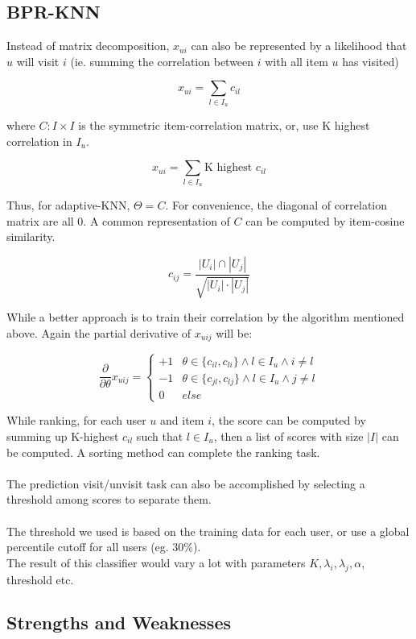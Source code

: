 \documentclass[paper=a4, fontsize=11pt, twocolumn]{scrartcl} %
\numberwithin{equation}{section} %
\numberwithin{figure}{section} %
\numberwithin{table}{section} %
\begin{document}
\subsection{BPR-KNN}

Instead of matrix decomposition, $x_{ui}$ can also be represented by a likelihood that $u$ will visit $i$ (ie. summing the correlation between $i$ with all item $u$ has visited)

$$x_{ui} = \sum_{l\in I_u}c_{il}$$

where $C:I\times I$ is the symmetric item-correlation matrix, or, use K highest correlation in $I_u$.

$$x_{ui} = \sum_{l\in I_u}\text{K highest }c_{il}$$

Thus, for adaptive-KNN, $\Theta = C$. For convenience, the diagonal of correlation matrix are all 0. A common representation of $C$ can be computed by item-cosine similarity.
 
$$c_{ij} = \frac{|U_i|\cap |U_j|}{\sqrt{|U_i|\cdot |U_j|}}$$

While a better approach is to train their correlation by the algorithm mentioned above. Again the partial derivative of $x_{uij}$ will be:

$$\frac{\partial}{\partial\theta}x_{uij}=\begin{cases}
+1& \theta\in \{c_{il},c_{li}\}\wedge l\in I_u\wedge i\not= l\\
-1& \theta\in \{c_{jl},c_{lj}\}\wedge l\in I_u\wedge j\not= l\\
0& else
\end{cases}$$

While ranking, for each user $u$ and item $i$, the score can be computed by summing up K-highest $c_{il}$ such that $l \in I_u$, then a list of scores with size $|I|$ can be computed. A sorting method can complete the ranking task.\\
\\
The prediction visit/unvisit task can also be accomplished by selecting a threshold among scores to separate them.\\
\\
The threshold we used is based on the training data for each user, or use a global percentile cutoff for all users (eg. 30\%).\\
The result of this classifier would vary a lot with parameters 
$K,\lambda_i,\lambda_j,\alpha$, threshold etc.


\subsection{Strengths and Weaknesses}
\end{document}
